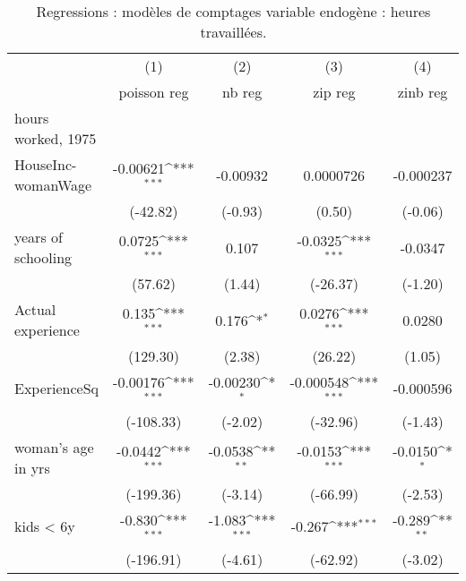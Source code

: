 {
\def\sym#1{\ifmmode^{#1}\else\(^{#1}\)\fi}
\begin{longtable}{l*{4}{c}}
\caption{Regressions : modèles de comptages variable endogène : heures travaillées.}\\
\hline\hline\endfirsthead\hline\endhead\hline\endfoot\endlastfoot
                    &\multicolumn{1}{c}{(1)}&\multicolumn{1}{c}{(2)}&\multicolumn{1}{c}{(3)}&\multicolumn{1}{c}{(4)}\\
                    &\multicolumn{1}{c}{poisson reg}&\multicolumn{1}{c}{nb reg}&\multicolumn{1}{c}{zip reg}&\multicolumn{1}{c}{zinb reg}\\
\hline
hours worked, 1975  &                     &                     &                     &                     \\
HouseInc-womanWage  &    -0.00621\sym{***}&    -0.00932         &   0.0000726         &   -0.000237         \\
                    &    (-42.82)         &     (-0.93)         &      (0.50)         &     (-0.06)         \\
years of schooling  &      0.0725\sym{***}&       0.107         &     -0.0325\sym{***}&     -0.0347         \\
                    &     (57.62)         &      (1.44)         &    (-26.37)         &     (-1.20)         \\
Actual experience   &       0.135\sym{***}&       0.176\sym{*}  &      0.0276\sym{***}&      0.0280         \\
                    &    (129.30)         &      (2.38)         &     (26.22)         &      (1.05)         \\
ExperienceSq        &    -0.00176\sym{***}&    -0.00230\sym{*}  &   -0.000548\sym{***}&   -0.000596         \\
                    &   (-108.33)         &     (-2.02)         &    (-32.96)         &     (-1.43)         \\
woman's age in yrs  &     -0.0442\sym{***}&     -0.0538\sym{**} &     -0.0153\sym{***}&     -0.0150\sym{*}  \\
                    &   (-199.36)         &     (-3.14)         &    (-66.99)         &     (-2.53)         \\
kids < 6y           &      -0.830\sym{***}&      -1.083\sym{***}&      -0.267\sym{***}&      -0.289\sym{**} \\
                    &   (-196.91)         &     (-4.61)         &    (-62.92)         &     (-3.02)         \\

\end{longtable}}
